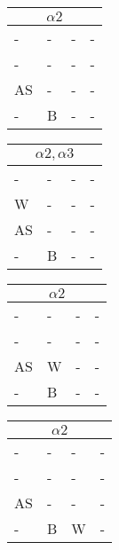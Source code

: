 \documentclass{math}
\begin{document}
\begin{center}
  \begin{tabular}{|p{0.6cm}|p{0.6cm}|p{0.6cm}|p{0.6cm}|}
    \hline
    \multicolumn{4}{|c|}{\( \alpha2 \)} \\ \hline
    - & - & - & - \\ \hline
    - & - & - & - \\ \hline
    AS & - & - & - \\ \hline
    - & B & - & - \\ \hline
  \end{tabular}
  \begin{tabular}{|p{0.6cm}|p{0.6cm}|p{0.6cm}|p{0.6cm}|}
    \hline
    \multicolumn{4}{|c|}{\( \alpha2,\alpha3 \)} \\ \hline
    - & - & - & - \\ \hline
    W & - & - & - \\ \hline
    AS & - & - & - \\ \hline
    - & B & - & - \\ \hline
  \end{tabular}
  \begin{tabular}{|p{0.6cm}|p{0.6cm}|p{0.6cm}|p{0.6cm}|}
    \hline
    \multicolumn{4}{|c|}{\( \alpha2 \)} \\ \hline
    - & - & - & - \\ \hline
    - & - & - & - \\ \hline
    AS & W & - & - \\ \hline
    - & B & - & - \\ \hline
  \end{tabular}
  \begin{tabular}{|p{0.6cm}|p{0.6cm}|p{0.6cm}|p{0.6cm}|}
    \hline
    \multicolumn{4}{|c|}{\( \alpha2 \)} \\ \hline
    - & - & - & - \\ \hline
    - & - & - & - \\ \hline
    AS & - & - & - \\ \hline
    - & B & W & - \\ \hline
  \end{tabular} \\[0.5cm]


\end{center}
\end{document}
